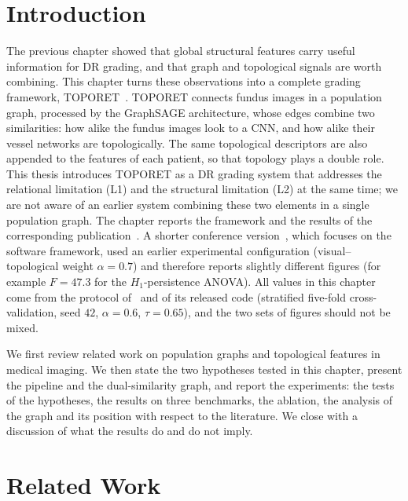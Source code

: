 \section*{Introduction}

The previous chapter showed that global structural features carry useful information for
DR grading, and that graph and topological signals are worth combining. This chapter turns
these observations into a complete grading framework, TOPORET~\cite{belhadj2025plos}.
TOPORET connects fundus images in a population graph, processed by the GraphSAGE
architecture, whose edges combine two similarities: how alike the fundus images look to a CNN, and how alike their vessel
networks are topologically. The same topological descriptors are also appended to the
features of each patient, so that topology plays a double role. This thesis introduces
TOPORET as a DR grading system that addresses the relational limitation (L1) and the
structural limitation (L2) at the same time; we are not aware of an earlier system
combining these two elements in a single population graph. The chapter reports
the framework and the results of the corresponding publication~\cite{belhadj2025plos}.
A shorter conference version~\cite{belhadj2026enase}, which focuses on the software
framework, used an earlier experimental configuration (visual--topological weight $\alpha=0.7$) and
therefore reports slightly different figures (for example $F=47.3$ for the
$H_1$-persistence ANOVA). All values in this chapter come from the protocol
of~\cite{belhadj2025plos} and of its released code (stratified five-fold cross-validation,
seed $42$, $\alpha=0.6$, $\tau=0.65$), and the two sets of figures should not be mixed.

We first review related work on population graphs and topological features in medical
imaging. We then state the two hypotheses tested in this chapter, present the pipeline and
the dual-similarity graph, and report the experiments: the tests of the hypotheses, the
results on three benchmarks, the ablation, the analysis of the graph and its position
with respect to the literature. We close with a discussion of what the results do and do not imply.

\section{Related Work}
\label{sec:ch3-related}

